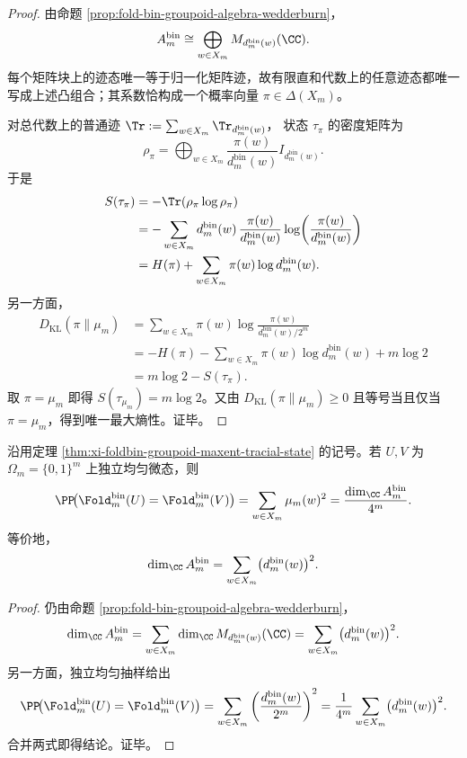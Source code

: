 \begin{proof}
由命题 \ref{prop:fold-bin-groupoid-algebra-wedderburn}，
\[
A_m^{\mathrm{bin}}
\cong
\bigoplus_{w\in X_m} M_{d_m^{\mathrm{bin}}(w)}(\CC).
\]
每个矩阵块上的迹态唯一等于归一化矩阵迹，故有限直和代数上的任意迹态都唯一写成上述凸组合；其系数恰构成一个概率向量 \(\pi\in\Delta(X_m)\)。
\par
对总代数上的普通迹
\(
\Tr:=\sum_{w\in X_m}\Tr_{d_m^{\mathrm{bin}}(w)}
\)，
状态 \(\tau_\pi\) 的密度矩阵为
\[
\rho_\pi
=
\bigoplus_{w\in X_m}
\frac{\pi(w)}{d_m^{\mathrm{bin}}(w)}I_{d_m^{\mathrm{bin}}(w)}.
\]
于是
\[
\begin{aligned}
S(\tau_\pi)
&=-\Tr(\rho_\pi\log\rho_\pi)\\
&=
-\sum_{w\in X_m}d_m^{\mathrm{bin}}(w)\,
\frac{\pi(w)}{d_m^{\mathrm{bin}}(w)}
\log\!\left(\frac{\pi(w)}{d_m^{\mathrm{bin}}(w)}\right)\\
&=
H(\pi)+\sum_{w\in X_m}\pi(w)\log d_m^{\mathrm{bin}}(w).
\end{aligned}
\]
另一方面，
\[
\begin{aligned}
D_{\mathrm{KL}}(\pi\|\mu_m)
&=
\sum_{w\in X_m}\pi(w)
\log\frac{\pi(w)}{d_m^{\mathrm{bin}}(w)/2^m}\\
&=
-H(\pi)-\sum_{w\in X_m}\pi(w)\log d_m^{\mathrm{bin}}(w)+m\log 2\\
&=
m\log 2-S(\tau_\pi).
\end{aligned}
\]
取 \(\pi=\mu_m\) 即得 \(S(\tau_{\mu_m})=m\log 2\)。又由 \(D_{\mathrm{KL}}(\pi\|\mu_m)\ge 0\) 且等号当且仅当 \(\pi=\mu_m\)，得到唯一最大熵性。证毕。
\end{proof}

\begin{theorem}[碰撞概率等于纤维群胚代数的归一化维数]\label{thm:xi-foldbin-collision-probability-normalized-groupoid-dimension}
沿用定理 \ref{thm:xi-foldbin-groupoid-maxent-tracial-state} 的记号。若 \(U,V\) 为 \(\Omega_m=\{0,1\}^m\) 上独立均匀微态，则
\[
\PP\!\bigl(\Fold^{\mathrm{bin}}_m(U)=\Fold^{\mathrm{bin}}_m(V)\bigr)
=
\sum_{w\in X_m}\mu_m(w)^2
=
\frac{\dim_{\CC}A_m^{\mathrm{bin}}}{4^m}.
\]
等价地，
\[
\dim_{\CC}A_m^{\mathrm{bin}}
=
\sum_{w\in X_m}\bigl(d_m^{\mathrm{bin}}(w)\bigr)^2.
\]
\end{theorem}
\begin{proof}
仍由命题 \ref{prop:fold-bin-groupoid-algebra-wedderburn}，
\[
\dim_{\CC}A_m^{\mathrm{bin}}
=
\sum_{w\in X_m}
\dim_{\CC}M_{d_m^{\mathrm{bin}}(w)}(\CC)
=
\sum_{w\in X_m}\bigl(d_m^{\mathrm{bin}}(w)\bigr)^2.
\]
另一方面，独立均匀抽样给出
\[
\PP\!\bigl(\Fold^{\mathrm{bin}}_m(U)=\Fold^{\mathrm{bin}}_m(V)\bigr)
=
\sum_{w\in X_m}
\left(\frac{d_m^{\mathrm{bin}}(w)}{2^m}\right)^2
=
\frac{1}{4^m}
\sum_{w\in X_m}\bigl(d_m^{\mathrm{bin}}(w)\bigr)^2.
\]
合并两式即得结论。证毕。
\end{proof}

